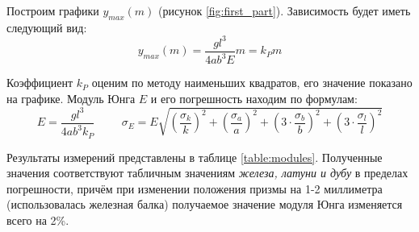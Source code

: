 \documentclass[a4paper, 10pt]{article}
\begin{document}
		\begin{table}[h!]
			\centering
			\caption{Измерения стрелы прогиба \emph{деревянной} балки}
			\label{table:wood}
			\vspace{-0.25cm}
		\end{table}
	
		Построим графики $y_{max}(m)$ (рисунок \ref{fig:first_part}). Зависимость будет иметь следующий вид:
		\[y_{max}\left(m\right) = \frac{gl^3}{4ab^3 E} m = k_P m\]
		
		Коэффициент $k_P$ оценим по методу наименьших квадратов, его значение показано на графике. Модуль Юнга $E$ и его погрешность находим по формулам:
		\[E = \frac{gl^3}{4ab^3k_P} \hspace{1cm} \sigma_E = E \sqrt{\left(\frac{\sigma_k}{k}\right)^2 + \left(\frac{\sigma_a}{a}\right)^2 + \left(3\cdot\frac{\sigma_b}{b}\right)^2 + \left(3\cdot\frac{\sigma_l}{l}\right)^2} \]
		
		Результаты измерений представлены в таблице \ref{table:modules}. Полученные значения соответствуют табличным значениям \emph{железа, латуни и дубу} в пределах погрешности, причём при изменении положения призмы на 1-2 миллиметра (использовалась железная балка) получаемое значение модуля Юнга изменяется всего на 2\%.
		
\end{document}
